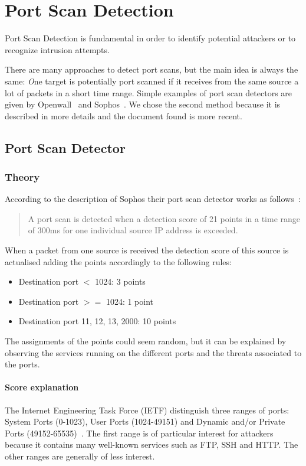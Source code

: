 \chapter{Port Scan Detection}
\label{sec:detector}
Port Scan Detection is fundamental in order
to identify potential attackers or to recognize intrusion attempts.

There are many approaches to detect port scans, but the main idea
is always the same: \textit{O}ne target is potentially port scanned if it receives
from the same source a lot of packets in a short time range.
Simple examples of port scan detectors are given by 
Openwall~\cite{scanlogd} and Sophos~\cite{sophos}.
We chose the second method because it is described in more details and the document found
is more recent.

\section{Port Scan Detector}


\subsection{Theory}
According to the description of Sophos their port scan detector works as follows~\cite{sophos}:
\begin{quote}
	A port scan is detected when a detection score of 21 points
	in a time range of 300ms for one individual source IP address is exceeded.
\end{quote}
When a packet from one source is received the detection score of this source
is actualised adding the points accordingly to the following rules:
\begin{itemize}
	\item Destination port $<$ 1024: 3 points
	\item Destination port $>=$ 1024: 1 point
	\item Destination port 11, 12, 13, 2000: 10 points
\end{itemize}
The assignments of the points could seem random, but it can be explained by observing the services running on the different ports and the threats associated to the ports.
\subsubsection{Score explanation}
The Internet Engineering Task Force (IETF) distinguish three ranges of ports: System Ports (0-1023), 
User Ports (1024-49151) and Dynamic and/or Private Ports (49152-65535)~\cite{rfc6335}.
The first range is of particular interest for attackers because it contains many well-known services such as FTP, SSH and HTTP.
The other ranges are generally of less interest.

